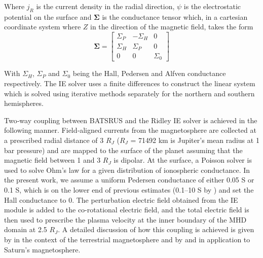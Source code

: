 Where $j_R$ is the current density in the radial direction, $\psi$ is the electrostatic potential on the surface and $\mathbf{\Sigma}$ is the conductance tensor which, in a cartesian coordinate system where $Z$ in the direction of the magnetic field, takes the form 
\begin{equation}
    \mathbf{\Sigma} = \left[ \begin{array}{ccc}
    \Sigma_P     &-\Sigma_H   &0  \\
    \Sigma_H     &\Sigma_P   &0  \\
    0          &0        &\Sigma_0
    \end{array} \right]
\end{equation}

With $\Sigma_H$, $\Sigma_P$ and $\Sigma_0$ being the Hall, Pedersen and Alfven conductance respectively. The IE solver uses a finite differences to construct the linear system which is solved using iterative methods separately for the northern and southern hemispheres.

Two‐way coupling between BATSRUS and the Ridley IE solver is achieved in the following manner. Field‐aligned currents from the magnetosphere are collected at a prescribed radial distance of 3 $R_J$ ($R_J$ = 71492 km is Jupiter's mean radius at 1 bar pressure) and are mapped to the surface of the planet assuming that the magnetic field between 1 and 3 $R_J$ is dipolar. At the surface, a Poisson solver is used to solve Ohm's law for a given distribution of ionospheric conductance. In the present work, we assume a uniform Pedersen conductance of either 0.05 S or 0.1 S, which is on the lower end of previous estimates (0.1–10 S by ) and set the Hall conductance to 0. The perturbation electric field obtained from the IE module is added to the co-rotational electric field, and the total electric field is then used to prescribe the plasma velocity at the inner boundary of the MHD domain at 2.5 $R_J$. A detailed discussion of how this coupling is achieved is given by  in the context of the terrestrial magnetosphere and by  and  in application to Saturn's magnetosphere.

